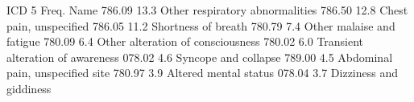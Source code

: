 ICD 5 Freq. Name 786.09 13.3 Other respiratory abnormalities 786.50 12.8\markdownRendererPercentSign{} Chest pain, unspecified 786.05 11.2\markdownRendererPercentSign{} Shortness of breath 780.79 7.4\markdownRendererPercentSign{} Other malaise and fatigue 780.09 6.4\markdownRendererPercentSign{} Other alteration of consciousness 780.02 6.0\markdownRendererPercentSign{} Transient alteration of awareness 078.02 4.6\markdownRendererPercentSign{} Syncope and collapse 789.00 4.5\markdownRendererPercentSign{} Abdominal pain, unspecified site 780.97 3.9\markdownRendererPercentSign{} Altered mental status 078.04 3.7\markdownRendererPercentSign{} Dizziness and giddiness\relax